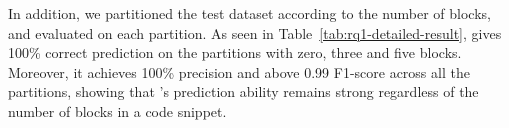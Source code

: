 In addition, we partitioned the test dataset according to the number
of  blocks, and evaluated {\xblock} on each
partition. As seen in Table~\ref{tab:rq1-detailed-result}, {\xblock}
gives 100\% correct prediction on the partitions with zero, three and
five  blocks. Moreover, it achieves 100\% precision
and above 0.99 F1-score across all the partitions, showing that
{\xblock}'s prediction ability remains strong regardless of the number
of  blocks in a code snippet.






